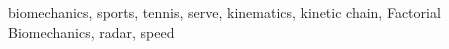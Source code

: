 \documentclass[12pt,conference,onecolumn]{IEEEtran}
\newcommand{\keywords}{biomechanics, sports, tennis, serve, kinematics, kinetic chain, Factorial Biomechanics, radar, speed}
\begin{document}
\begin{abstract}
%
%
 \end{abstract}

\begin{IEEEkeywords}
\keywords
\end{IEEEkeywords}
\end{document}
